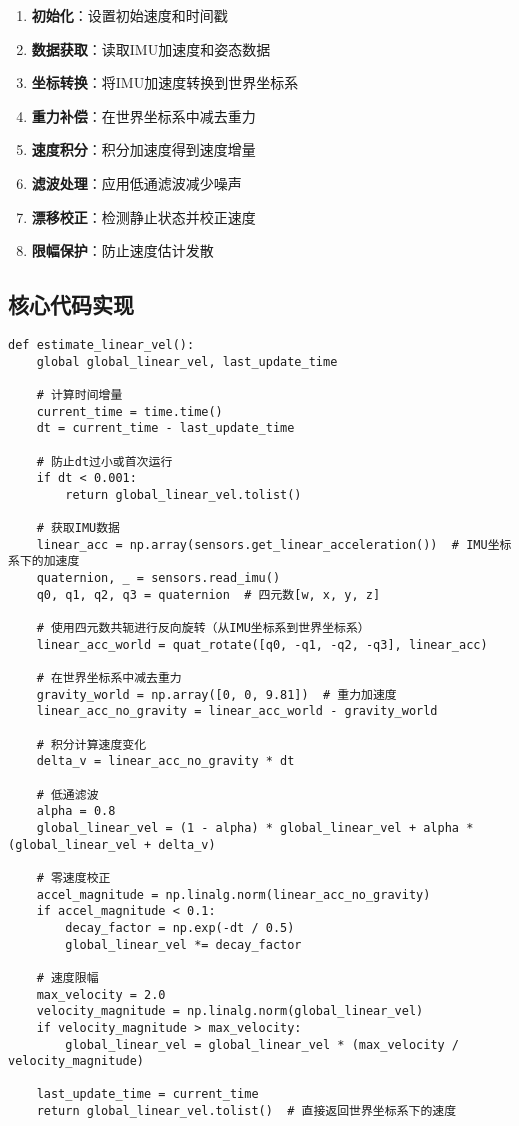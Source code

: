 \documentclass[12pt,a4paper]{article}
\begin{document}
\begin{enumerate}
    \item \textbf{初始化}：设置初始速度和时间戳
    \item \textbf{数据获取}：读取IMU加速度和姿态数据
    \item \textbf{坐标转换}：将IMU加速度转换到世界坐标系
    \item \textbf{重力补偿}：在世界坐标系中减去重力
    \item \textbf{速度积分}：积分加速度得到速度增量
    \item \textbf{滤波处理}：应用低通滤波减少噪声
    \item \textbf{漂移校正}：检测静止状态并校正速度
    \item \textbf{限幅保护}：防止速度估计发散
\end{enumerate}

\subsection{核心代码实现}

\begin{lstlisting}
def estimate_linear_vel():
    global global_linear_vel, last_update_time
    
    # 计算时间增量
    current_time = time.time()
    dt = current_time - last_update_time
    
    # 防止dt过小或首次运行
    if dt < 0.001:
        return global_linear_vel.tolist()
    
    # 获取IMU数据
    linear_acc = np.array(sensors.get_linear_acceleration())  # IMU坐标系下的加速度
    quaternion, _ = sensors.read_imu()
    q0, q1, q2, q3 = quaternion  # 四元数[w, x, y, z]
    
    # 使用四元数共轭进行反向旋转（从IMU坐标系到世界坐标系）
    linear_acc_world = quat_rotate([q0, -q1, -q2, -q3], linear_acc)
    
    # 在世界坐标系中减去重力
    gravity_world = np.array([0, 0, 9.81])  # 重力加速度
    linear_acc_no_gravity = linear_acc_world - gravity_world
    
    # 积分计算速度变化
    delta_v = linear_acc_no_gravity * dt
    
    # 低通滤波
    alpha = 0.8
    global_linear_vel = (1 - alpha) * global_linear_vel + alpha * (global_linear_vel + delta_v)
    
    # 零速度校正
    accel_magnitude = np.linalg.norm(linear_acc_no_gravity)
    if accel_magnitude < 0.1:
        decay_factor = np.exp(-dt / 0.5)
        global_linear_vel *= decay_factor
    
    # 速度限幅
    max_velocity = 2.0
    velocity_magnitude = np.linalg.norm(global_linear_vel)
    if velocity_magnitude > max_velocity:
        global_linear_vel = global_linear_vel * (max_velocity / velocity_magnitude)
    
    last_update_time = current_time
    return global_linear_vel.tolist()  # 直接返回世界坐标系下的速度
\end{lstlisting}
\end{document}
